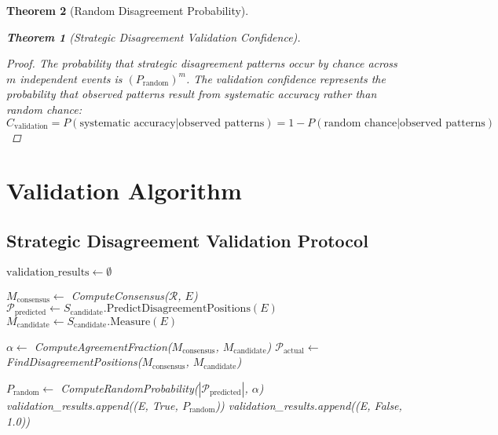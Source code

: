 \documentclass[12pt,a4paper]{article}
\newtheorem{theorem}{Theorem}
\begin{document}
\begin{theorem}[Random Disagreement Probability]
\begin{theorem}[Strategic Disagreement Validation Confidence]
\begin{proof}
The probability that strategic disagreement patterns occur by chance across $m$ independent events is $(P_{\text{random}})^m$. The validation confidence represents the probability that observed patterns result from systematic accuracy rather than random chance:
\begin{equation}
C_{\text{validation}} = P(\text{systematic accuracy}|\text{observed patterns}) = 1 - P(\text{random chance}|\text{observed patterns})
\end{equation}
\end{proof}

\section{Validation Algorithm}

\subsection{Strategic Disagreement Validation Protocol}

\begin{algorithm}[H]
\caption{Strategic Disagreement Validation}
\label{alg:strategic_disagreement_validation}
\begin{algorithmic}[1]
    \State $\text{validation\_results} \gets \emptyset$

        \State $M_{\text{consensus}} \gets$ ComputeConsensus($\mathcal{R}$, $E$)
        \State $\mathcal{P}_{\text{predicted}} \gets S_{\text{candidate}}.\text{PredictDisagreementPositions}(E)$
        \State $M_{\text{candidate}} \gets S_{\text{candidate}}.\text{Measure}(E)$

        \State $\alpha \gets$ ComputeAgreementFraction($M_{\text{consensus}}$, $M_{\text{candidate}}$)
        \State $\mathcal{P}_{\text{actual}} \gets$ FindDisagreementPositions($M_{\text{consensus}}$, $M_{\text{candidate}}$)

            \State $P_{\text{random}} \gets$ ComputeRandomProbability($|\mathcal{P}_{\text{predicted}}|$, $\alpha$)
            \State validation\_results.append((E, True, $P_{\text{random}}$))
        \Else
            \State validation\_results.append((E, False, 1.0))
        \EndIf
    \EndFor


\end{algorithmic}
\end{algorithm}
\end{theorem}
\end{theorem}
\end{document}
